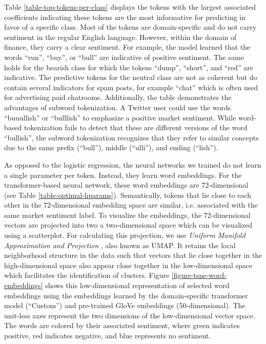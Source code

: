 Table \ref{table-top-tokens-per-class} displays the tokens with the largest associated coefficients indicating these tokens are the most informative for predicting in favor of a specific class. Most of the tokens are domain-specific and do not carry sentiment in the regular English language. However, within the domain of finance, they carry a clear sentiment. For example, the model learned that the words ``run'', ``buy'', or ``bull'' are indicative of positive sentiment. The same holds for the bearish class for which the tokens ``dump'', ``short'', and ``red'' are indicative. The predictive tokens for the neutral class are not as coherent but do contain several indicators for spam posts, for example ``chat'' which is often used for advertising paid chatrooms. Additionally, the table demonstrates the advantages of subword tokenization. A Twitter user could use the words ``buuullish'' or ``bulllish'' to emphasize a positive market sentiment. While word-based tokenization fails to detect that these are different versions of the word ``bullish'', the subword tokenization recognizes that they refer to similar concepts due to the same prefix (``bull''), middle (``ulli''), and ending (``lish'').



As opposed to the logistic regression, the neural networks we trained do not learn a single parameter per token. Instead, they learn word embeddings. For the transformer-based neural network, these word embeddings are 72-dimensional (see Table \ref{table-optimal-hparams}). Semantically, tokens that lie close to each other in the 72-dimensional embedding space are similar, i.e. associated with the same market sentiment label. To visualize the embeddings, the 72-dimensional vectors are projected into two a two-dimensional space which can be visualized using a scatterplot. For calculating this projection, we use \emph{Uniform Manifold Approximation and Projection} , also known as UMAP. It retains the local neighborhood structure in the data such that vectors that lie close together in the high-dimensional space also appear close together in the low-dimensional space which facilitates the identification of clusters. Figure \ref{figure-tsne-word-embeddings} shows this low-dimensional representation of selected word embeddings using the embeddings learned by the domain-specific transformer model (``Custom'') and pre-trained GloVe embeddings (50-dimensional). The unit-less axes represent the two dimensions of the low-dimensional vector space. The words are colored by their associated sentiment, where green indicates positive, red indicates negative, and blue represents no sentiment.

